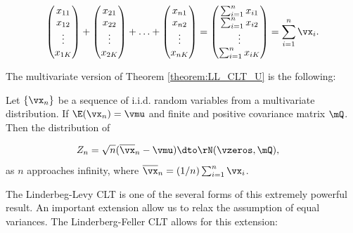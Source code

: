 \documentclass[english,12pt]{book}\usepackage[]{graphicx}\usepackage[]{xcolor}
\begin{document}
\begin{equation*}
\begin{pmatrix}
        x_{11}\\
        x_{12} \\
        \vdots\\
        x_{1K}
      \end{pmatrix} +
\begin{pmatrix}
        x_{21}\\
        x_{22} \\
        \vdots\\
        x_{2K}
      \end{pmatrix}+
\hdots +
\begin{pmatrix}
        x_{n1}\\
        x_{n2} \\
        \vdots\\
        x_{nK}
      \end{pmatrix} =
\begin{pmatrix}
\sum_{i = 1}^n x_{i1} \\
\sum_{i = 1}^n x_{i2} \\
\vdots \\
\sum_{i = 1}^n x_{iK}
\end{pmatrix}=
\sum_{i = 1}^n\vx_i.
\end{equation*}

The multivariate version of Theorem \ref{theorem:LL_CLT_U} is the following:


\begin{theorem}\label{theorem:LL_CLT_M}
Let $\left\lbrace \vx_n \right\rbrace$ be a sequence of i.i.d. random variables from a multivariate distribution. If $\E(\vx_n) = \vmu$ and finite and positive covariance matrix $\mQ$. Then the distribution of

\begin{equation*}
  \begin{aligned}
      Z_n & = \sqrt{n}(\overline{\vx}_n - \vmu) \dto \rN(\vzeros, \mQ), 
  \end{aligned}
\end{equation*}
%
as $n$ approaches infinity, where $\overline{\vx}_n = (1 / n)\sum_{i = 1}^n\vx_i$.
\end{theorem}

The Linderbeg-Levy CLT is one of the several forms of this extremely powerful result. An important extension allow us to relax the assumption of equal variances. The Linderberg-Feller CLT allows for this extension:
\end{document}
